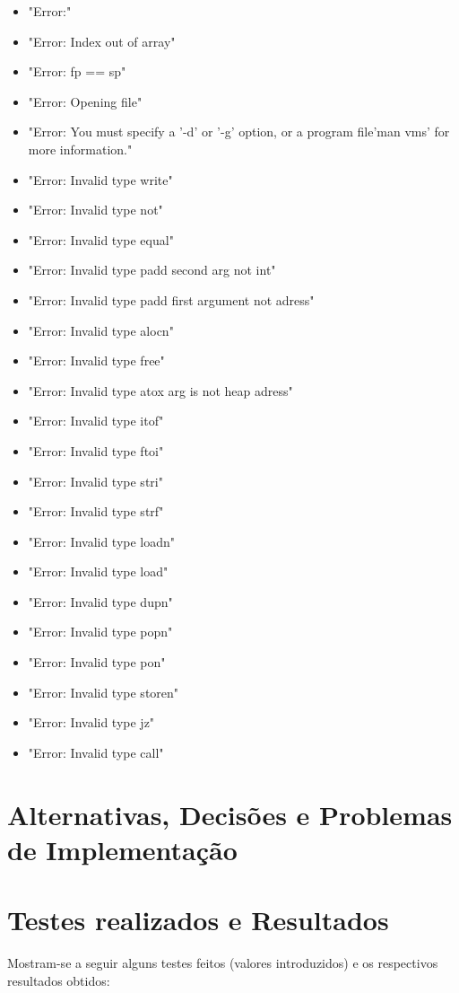 \documentclass{report}
\begin{document}
\begin{itemize}
\item "Error:"
\item "Error: Index out of array"
\item "Error: fp == sp"
\item "Error: Opening file"
\item "Error: You must specify a '-d' or '-g' option, or a program file\nTry 'man vms' for more information.\n"
\item "Error: Invalid type write"
\item "Error: Invalid type not"
\item "Error: Invalid type equal"
\item "Error: Invalid type padd second arg not int"
\item "Error: Invalid type padd first argument not adress"
\item "Error: Invalid type alocn"
\item "Error: Invalid type free"
\item "Error: Invalid type atox arg is not heap adress"
\item "Error: Invalid type itof"
\item "Error: Invalid type ftoi"
\item "Error: Invalid type stri"
\item "Error: Invalid type strf"
\item "Error: Invalid type loadn"
\item "Error: Invalid type load"
\item "Error: Invalid type dupn"
\item "Error: Invalid type popn"
\item "Error: Invalid type pon"
\item "Error: Invalid type storen"
\item "Error: Invalid type jz"
\item "Error: Invalid type call"
\end{itemize}

\section{Alternativas, Decisões e Problemas de Implementação}
\section{Testes realizados e Resultados}
Mostram-se a seguir alguns testes feitos (valores introduzidos) e
os respectivos resultados obtidos:
\end{document}

